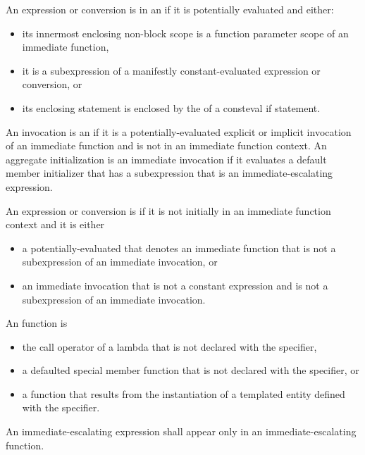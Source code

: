 \pnum
An expression or conversion is in an 
if it is potentially evaluated and either:
\begin{itemize}
\item
its innermost enclosing non-block scope is
a function parameter scope of an immediate function,
\item
it is a subexpression of a manifestly constant-evaluated expression
or conversion, or
\item
its enclosing statement is enclosed by
the  of a consteval if statement.
\end{itemize}
An invocation is an 
if it is a potentially-evaluated explicit or implicit invocation of
an immediate function and
is not in an immediate function context.
An aggregate initialization is an immediate invocation
if it evaluates a default member initializer
that has a subexpression that is an immediate-escalating expression.

\pnum
{}%
%
%
%
An expression or conversion is 
if it is not initially in an immediate function context
and it is either
\begin{itemize}
\item
a potentially-evaluated 
that denotes an immediate function
that is not a subexpression of an immediate invocation, or
\item
an immediate invocation that is not a constant expression
and is not a subexpression of an immediate invocation.
\end{itemize}

\pnum
{}%
An  function is
\begin{itemize}
\item
the call operator of a lambda that is not declared
with the  specifier,
\item
a defaulted special member function
that is not declared with the  specifier, or
\item
a function that results from the instantiation
of a templated entity defined with the  specifier.
\end{itemize}
An immediate-escalating expression shall appear only
in an immediate-escalating function.

